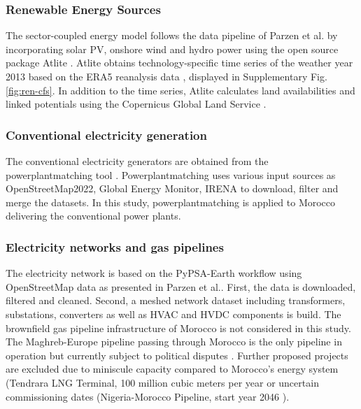 \documentclass[5p,numafflabel]{elsarticle}
\begin{document}
\subsubsection*{Renewable Energy Sources}
The sector-coupled energy model follows the data pipeline of Parzen et al.\cite{Parzen2023} by incorporating solar PV, onshore wind and hydro power using the open source package Atlite \cite{Hofmann2021}.
Atlite obtains technology-specific time series of the weather year 2013 based on the ERA5 reanalysis data \cite{Hersbach2020}, displayed in Supplementary Fig. \ref{fig:ren-cfs}. In addition to the time series, Atlite calculates land availabilities and linked potentials using the Copernicus Global Land Service \cite{Buchhorn2020}.






\subsubsection*{Conventional electricity generation}
The conventional electricity generators are obtained from the powerplantmatching tool \cite{Powerplantmatching2019}. Powerplantmatching uses various input sources as OpenStreetMap2022, Global Energy Monitor, IRENA \cite{IRENA2022, OpenStreetMap2022, GlobalEnergyMonitor} to download, filter and merge the datasets. 
In this study, powerplantmatching is applied to Morocco delivering the conventional power plants.

\subsubsection*{Electricity networks and gas pipelines}
The electricity network is based on the PyPSA-Earth workflow using OpenStreetMap data \cite{OpenStreetMap2022} as presented in Parzen et al.\cite{Parzen2023}. First, the data is downloaded, filtered and cleaned. Second, a meshed network dataset including transformers, substations, converters as well as HVAC and HVDC components is build\cite{Parzen2023}. 
The brownfield gas pipeline infrastructure of Morocco is not considered in this study. The Maghreb-Europe pipeline passing through Morocco is the only pipeline in operation but currently subject to political disputes \cite{Rachidi2022}. Further proposed projects are excluded due to  miniscule capacity compared to Morocco's energy system (Tendrara LNG Terminal, 100 million cubic meters per year or uncertain commissioning dates (Nigeria-Morocco Pipeline, start year 2046 \cite{GEM2023b}).
\end{document}
